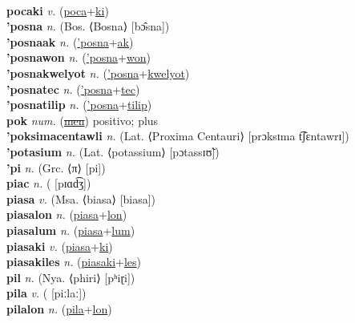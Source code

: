  \label{pocalon} \\
\textbf{pocaki} \textit{v.} (\hyperref[poca]{poca}+\hyperref[ki]{ki})
 \label{pocaki} \\
\textbf{'posna} \textit{n.} (Bos. ⟨Bosna⟩ [bɔ̂sna])
 \label{'posna} \\
\textbf{'posnaak} \textit{n.} (\hyperref['posna]{'posna}+\hyperref[ak]{ak})
 \label{'posnaak} \\
\textbf{'posnawon} \textit{n.} (\hyperref['posna]{'posna}+\hyperref[won]{won})
 \label{'posnawon} \\
\textbf{'posnakwelyot} \textit{n.} (\hyperref['posna]{'posna}+\hyperref[kwelyot]{kwelyot})
 \label{'posnakwelyot} \\
\textbf{'posnatec} \textit{n.} (\hyperref['posna]{'posna}+\hyperref[tec]{tec})
 \label{'posnatec} \\
\textbf{'posnatilip} \textit{n.} (\hyperref['posna]{'posna}+\hyperref[tilip]{tilip})
 \label{'posnatilip} \\
\textbf{pok} \textit{num.} (\hyperref[men]{\sout{men}})
positivo; plus \label{pok} \\
\textbf{'poksimacentawli} \textit{n.} (Lat. ⟨Proxima Centauri⟩ [prɔksɪma t͡ʃɛntawrɪ])
 \label{'poksimacentawli} \\
\textbf{'potasium} \textit{n.} (Lat. ⟨potassium⟩ [pɔtassɪʊ̃])
 \label{'potasium} \\
\textbf{'pi} \textit{n.} (Grc. ⟨π⟩ [pi])
 \label{'pi} \\
\textbf{piac} \textit{n.} ( [pɪɑd͡ʒ])
 \label{piac} \\
\textbf{piasa} \textit{v.} (Msa. ⟨biasa⟩ [biasa])
 \label{piasa} \\
\textbf{piasalon} \textit{n.} (\hyperref[piasa]{piasa}+\hyperref[lon]{lon})
 \label{piasalon} \\
\textbf{piasalum} \textit{n.} (\hyperref[piasa]{piasa}+\hyperref[lum]{lum})
 \label{piasalum} \\
\textbf{piasaki} \textit{v.} (\hyperref[piasa]{piasa}+\hyperref[ki]{ki})
 \label{piasaki} \\
\textbf{piasakiles} \textit{n.} (\hyperref[piasaki]{piasaki}+\hyperref[les]{les})
 \label{piasakiles} \\
\textbf{pil} \textit{n.} (Nya. ⟨phiri⟩ [pʰiɽi])
 \label{pil} \\
\textbf{pila} \textit{v.} ( [piːlaː])
 \label{pila} \\
\textbf{pilalon} \textit{n.} (\hyperref[pila]{pila}+\hyperref[lon]{lon})
 \label{pilalon} \\
